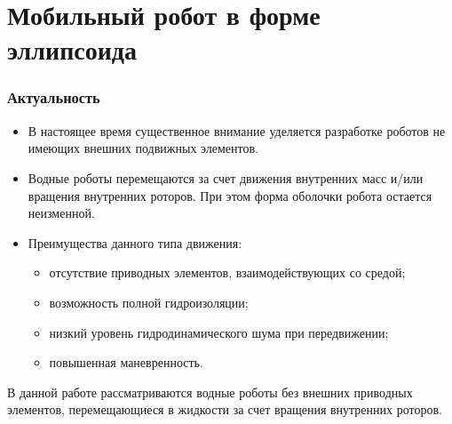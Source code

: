 

\section{Мобильный робот в форме эллипсоида}
\small


\begin{frame}
\frametitle{Актуальность}
	\begin{itemize}
		\item В настоящее время существенное внимание уделяется разработке роботов не имеющих внешних подвижных элементов.
		\item Водные роботы перемещаются за счет движения внутренних масс и/или вращения внутренних роторов. При этом форма оболочки робота остается неизменной.
		\item Преимущества данного типа движения:
			\begin{itemize}
				\item отсутствие приводных элементов, взаимодействующих со средой;
				\item возможность полной гидроизоляции;
				\item низкий уровень гидродинамического шума при передвижении;
				\item повышенная маневренность.
			\end{itemize}
		
	\end{itemize}

	В данной работе рассматриваются водные роботы без внешних приводных элементов, перемещающиеся в жидкости за счет вращения внутренних роторов.

\end{frame}

